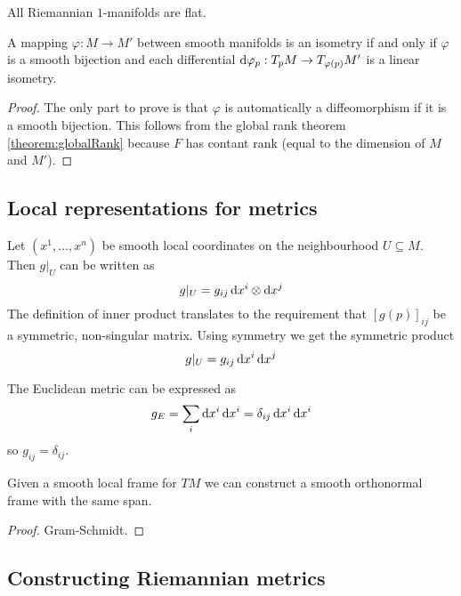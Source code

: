 \begin{lemma}
All Riemannian $1$-manifolds are flat.
\end{lemma}

\begin{lemma}
A mapping $\varphi:M\to M'$ between smooth manifolds is an isometry \textup{if and only if} $\varphi$ is a smooth bijection and each differential $\operatorname{d \!}\varphi_p:T_pM\to T_{\varphi(p)}M'$ is a linear isometry.
\end{lemma}
\begin{proof}
The only part to prove is that $\varphi$ is automatically a diffeomorphism if it is a smooth bijection. This follows from the global rank theorem \ref{theorem:globalRank} because $F$ has contant rank (equal to the dimension of $M$ and $M'$).
\end{proof}

\subsection{Local representations for metrics}
Let $(x^1, \ldots, x^n)$ be smooth local coordinates on the neighbourhood $U\subseteq M$. Then $g|_U$ can be written as
\[ g|_U = g_{ij}\operatorname{d \!}{x^i}\otimes\operatorname{d \!}{x^j}  \]
The definition of inner product translates to the requirement that $[g(p)]_{ij}$ be a symmetric, non-singular matrix. Using symmetry we get the symmetric product
\[ g|_U = g_{ij}\operatorname{d \!}{x^i}\operatorname{d \!}{x^j} \]

\begin{example}
The Euclidean metric can be expressed as
\[ g_E = \sum_i\operatorname{d \!}{x^i}\operatorname{d \!}{x^i} = \delta_{ij}\operatorname{d \!}{x^i}\operatorname{d \!}{x^i} \]
so $g_{ij} = \delta_{ij}$.
\end{example}

\begin{proposition}
Given a smooth local frame for $TM$ we can construct a smooth orthonormal frame with the same span.
\end{proposition}
\begin{proof}
Gram-Schmidt.
\end{proof}

\subsection{Constructing Riemannian metrics}

